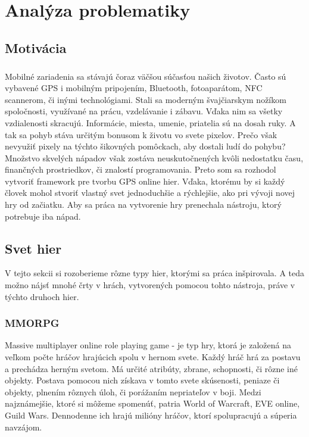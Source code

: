 \chapter{Analýza problematiky}
\section{Motivácia}
\paragraph{}
Mobilné zariadenia sa stávajú čoraz väčšou súčasťou našich životov. Často sú vybavené GPS i mobilným pripojením, Bluetooth, fotoaparátom, NFC scannerom, či inými technológiami. Stali sa moderným švajčiarskym nožíkom spoločnosti, využívané na prácu, vzdelávanie i zábavu. Vďaka nim sa všetky vzdialenosti skracujú. Informácie, miesta, umenie, priatelia sú na dosah ruky. A tak sa pohyb stáva určitým bonusom k životu vo svete pixelov. Prečo však nevyužiť pixely na týchto šikovných pomôckach, aby dostali ludí do pohybu?\\
Množstvo skvelých nápadov však zostáva neuskutočnených kvôli nedostatku času, finančných prostriedkov, či znalostí programovania. Preto som sa rozhodol vytvoriť framework pre tvorbu GPS online hier. Vďaka, ktorému by si každý človek mohol stvoriť vlastný svet jednoduchšie a rýchlejšie, ako pri vývoji novej hry od začiatku. Aby sa práca na vytvorenie hry prenechala nástroju, ktorý potrebuje iba nápad.

\section{Svet hier}
V tejto sekcii si rozoberieme rôzne typy hier, ktorými sa práca inšpirovala. A teda možno nájsť mnohé črty v hrách, vytvorených pomocou tohto nástroja, práve v týchto druhoch hier. 

\subsection{MMORPG}
Massive multiplayer online role playing game - je typ hry, ktorá je založená na veľkom počte hráčov hrajúcich spolu v hernom svete. Každý hráč hrá za postavu a prechádza herným svetom. Má určité atribúty, zbrane, schopnosti, či rôzne iné objekty. Postava pomocou nich získava v tomto svete skúsenosti, peniaze či objekty, plnením rôznych úloh, či porážaním nepriateľov v boji. 
Medzi najznámejšie, ktoré si môžeme spomenúť, patria World of Warcraft, EVE online, Guild Wars. Dennodenne ich hrajú milióny hráčov, ktorí spolupracujú a súperia navzájom.

